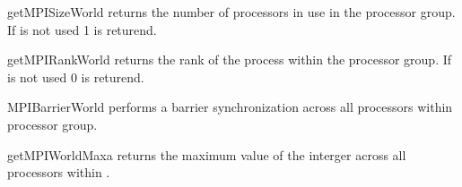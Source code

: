 \begin{funcdesc}{getMPISizeWorld}{}
returns the number of \MPI processors in use in the  processor group.
If \MPI is not used 1 is returend.
\end{funcdesc}
\begin{funcdesc}{getMPIRankWorld}{}
returns the rank of the process within the  processor group.
If \MPI is not used 0 is returend.
\end{funcdesc}
\begin{funcdesc}{MPIBarrierWorld}{}
performs a barrier synchronization across all processors within 
processor group.
\end{funcdesc}
\begin{funcdesc}{getMPIWorldMax}{a}
returns the maximum value of the interger  across all 
processors within .
\end{funcdesc}
